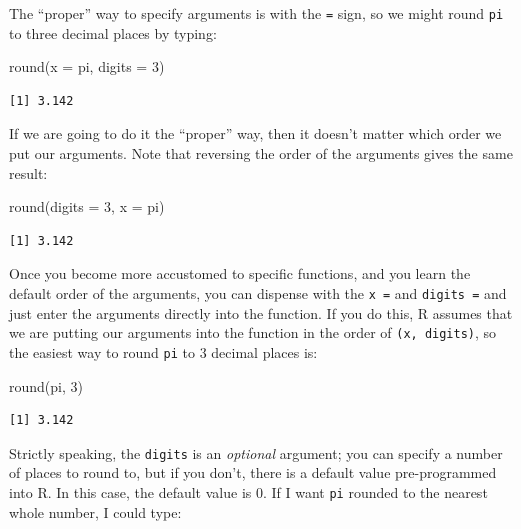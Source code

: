 \documentclass[
  letterpaper,
]{book}
\newenvironment{Shaded}{\begin{snugshade}}{\end{snugshade}}
\newcommand{\AttributeTok}[1]{\textcolor[rgb]{0.40,0.45,0.13}{#1}}
\newcommand{\DecValTok}[1]{\textcolor[rgb]{0.68,0.00,0.00}{#1}}
\newcommand{\FunctionTok}[1]{\textcolor[rgb]{0.28,0.35,0.67}{#1}}
\newcommand{\NormalTok}[1]{\textcolor[rgb]{0.00,0.23,0.31}{#1}}
\begin{document}
The ``proper'' way to specify arguments is with the \texttt{=} sign, so
we might round \texttt{pi} to three decimal places by typing:

\begin{Shaded}
\begin{Highlighting}[]
\FunctionTok{round}\NormalTok{(}\AttributeTok{x =}\NormalTok{ pi, }\AttributeTok{digits =} \DecValTok{3}\NormalTok{)}
\end{Highlighting}
\end{Shaded}

\begin{verbatim}
[1] 3.142
\end{verbatim}

If we are going to do it the ``proper'' way, then it doesn't matter
which order we put our arguments. Note that reversing the order of the
arguments gives the same result:

\begin{Shaded}
\begin{Highlighting}[]
\FunctionTok{round}\NormalTok{(}\AttributeTok{digits =} \DecValTok{3}\NormalTok{, }\AttributeTok{x =}\NormalTok{ pi)}
\end{Highlighting}
\end{Shaded}

\begin{verbatim}
[1] 3.142
\end{verbatim}

Once you become more accustomed to specific functions, and you learn the
default order of the arguments, you can dispense with the \texttt{x\ =}
and \texttt{digits\ =} and just enter the arguments directly into the
function. If you do this, R assumes that we are putting our arguments
into the function in the order of \texttt{(x,\ digits)}, so the easiest
way to round \texttt{pi} to 3 decimal places is:

\begin{Shaded}
\begin{Highlighting}[]
\FunctionTok{round}\NormalTok{(pi, }\DecValTok{3}\NormalTok{)}
\end{Highlighting}
\end{Shaded}

\begin{verbatim}
[1] 3.142
\end{verbatim}

Strictly speaking, the \texttt{digits} is an \emph{optional} argument;
you can specify a number of places to round to, but if you don't, there
is a default value pre-programmed into R. In this case, the default
value is 0. If I want \texttt{pi} rounded to the nearest whole number, I
could type:
\end{document}
